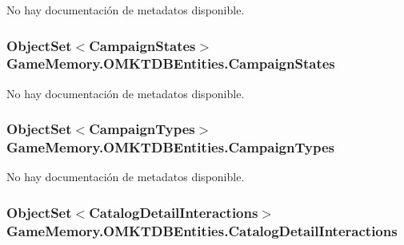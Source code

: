 No hay documentación de metadatos disponible. 

\hypertarget{class_game_memory_1_1_o_m_k_t_d_b_entities_a40eafcb06172d71454243edd172cabab}{
\subsubsection[{Campaign\-States}]{\setlength{\rightskip}{0pt plus 5cm}Object\-Set$<${\bf Campaign\-States}$>$ Game\-Memory.\-O\-M\-K\-T\-D\-B\-Entities.\-Campaign\-States\hspace{0.3cm}{\ttfamily [get]}}}\label{class_game_memory_1_1_o_m_k_t_d_b_entities_a40eafcb06172d71454243edd172cabab}


No hay documentación de metadatos disponible. 

\hypertarget{class_game_memory_1_1_o_m_k_t_d_b_entities_a2ba2ce1961e801eff559deb4772485e7}{
\subsubsection[{Campaign\-Types}]{\setlength{\rightskip}{0pt plus 5cm}Object\-Set$<${\bf Campaign\-Types}$>$ Game\-Memory.\-O\-M\-K\-T\-D\-B\-Entities.\-Campaign\-Types\hspace{0.3cm}{\ttfamily [get]}}}\label{class_game_memory_1_1_o_m_k_t_d_b_entities_a2ba2ce1961e801eff559deb4772485e7}


No hay documentación de metadatos disponible. 

\hypertarget{class_game_memory_1_1_o_m_k_t_d_b_entities_a04d2af206e9f37a53604c9a73ed00fc7}{
\subsubsection[{Catalog\-Detail\-Interactions}]{\setlength{\rightskip}{0pt plus 5cm}Object\-Set$<${\bf Catalog\-Detail\-Interactions}$>$ Game\-Memory.\-O\-M\-K\-T\-D\-B\-Entities.\-Catalog\-Detail\-Interactions\hspace{0.3cm}{\ttfamily [get]}}}\label{class_game_memory_1_1_o_m_k_t_d_b_entities_a04d2af206e9f37a53604c9a73ed00fc7}


